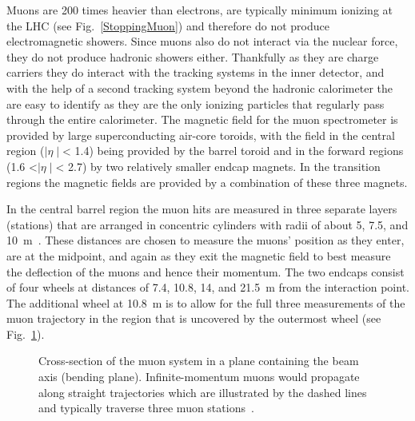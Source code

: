 Muons are 200 times heavier than electrons, are typically minimum ionizing at the LHC (see Fig.~\ref{StoppingMuon}) and therefore do not produce electromagnetic showers.  
Since muons also do not interact via the nuclear force, they do not produce hadronic showers either.  
Thankfully as they are charge carriers they do interact with the tracking systems in the inner detector, and with the help of a second tracking system beyond the hadronic calorimeter the are easy to identify as they are the only ionizing particles that regularly pass through the entire calorimeter.  
The magnetic field for the muon spectrometer is provided by large superconducting air-core toroids, with the field in the central region ($\mid\eta\mid$< 1.4) being provided by the barrel toroid and in the forward regions (1.6 <$\mid\eta\mid$< 2.7) by two relatively smaller endcap magnets.  
In the transition regions the magnetic fields are provided by a combination of these three magnets.  

In the central barrel region the muon hits are measured in three separate layers (stations) that are arranged in concentric cylinders with radii of about 5, 7.5, and 10~m~\cite{MuonTDR}.  
These distances are chosen to measure the muons' position as they enter, are at the midpoint, and again as they exit the magnetic field to best measure the deflection of the muons and hence their momentum.  
The two endcaps consist of four wheels at distances of 7.4, 10.8, 14, and 21.5~m from the interaction point. 
The additional wheel at 10.8~m is to allow for the full three measurements of the muon trajectory in the region that is uncovered by the outermost wheel (see Fig.~\ref{MuonSpectroFig}).


\begin{figure}[!ht]
  \begin{center}
  \end{center}
  \caption[Stopping power for positive muons in copper.]
      {\small Cross-section of the muon system in a plane containing the beam axis (bending plane). Infinite-momentum muons would propagate along straight trajectories which are illustrated by the dashed lines and typically traverse three muon stations~\cite{JOIATLAS}.}
  \label{MuonSpectroFig}
\end{figure}

